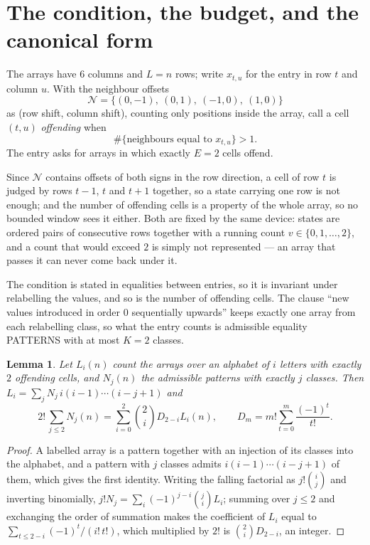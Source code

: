 \documentclass[11pt,a4paper]{article}
\theoremstyle{plain}
\newtheorem{lemma}[theorem]{Lemma}
\theoremstyle{definition}
\begin{document}
\section{The condition, the budget, and the canonical form}

The arrays have $6$ columns and $L=n$ rows; write $x_{t,u}$ for the entry in
row $t$ and column $u$. With the neighbour offsets
\[
\mathcal N=\{(0,-1),\ (0,1),\ (-1,0),\ (1,0)\}
\]
as (row shift, column shift), counting only positions inside the array, call a cell
$(t,u)$ \emph{offending} when
\[
\#\{\text{neighbours equal to }x_{t,u}\}>1 .
\]
The entry asks for arrays in which exactly $E=2$ cells offend.

Since $\mathcal N$ contains offsets of both signs in the row direction, a cell of row
$t$ is judged by rows $t-1$, $t$ and $t+1$ together, so a state carrying one row is not
enough; and the number of offending cells is a property of the whole array, so no bounded
window sees it either. Both are fixed by the same device: states are ordered pairs of
consecutive rows together with a running count $v\in\{0,1,\dots,2\}$, and a count that
would exceed $2$ is simply not represented --- an array that passes it can never come back
under it.

The condition is stated in equalities between entries, so it is invariant under relabelling
the values, and so is the number of offending cells. The clause ``new values introduced in
order $0$ sequentially upwards'' keeps exactly one array from each relabelling class, so what
the entry counts is admissible equality PATTERNS with at most $K=2$ classes.

\begin{lemma}\label{lem:inv}
Let $L_i(n)$ count the arrays over an alphabet of $i$ letters with exactly $2$ offending
cells, and $N_j(n)$ the admissible patterns with exactly $j$ classes. Then
$L_i=\sum_j N_j\,i(i-1)\cdots(i-j+1)$ and
\[
2!\,\sum_{j\le2}N_j(n)=\sum_{i=0}^{2}\binom{2}{i}D_{2-i}L_i(n),
\qquad D_m=m!\sum_{t=0}^{m}\frac{(-1)^t}{t!} .
\]
\end{lemma}

\begin{proof}
A labelled array is a pattern together with an injection of its classes into the alphabet,
and a pattern with $j$ classes admits $i(i-1)\cdots(i-j+1)$ of them, which gives the first
identity. Writing the falling factorial as $j!\binom{i}{j}$ and inverting binomially,
$j!N_j=\sum_i(-1)^{j-i}\binom{j}{i}L_i$; summing over $j\le2$ and exchanging the
order of summation makes the coefficient of $L_i$ equal to
$\sum_{t\le2-i}(-1)^t/(i!\,t!)$, which multiplied by $2!$ is
$\binom{2}{i}D_{2-i}$, an integer.
\end{proof}
\end{document}
